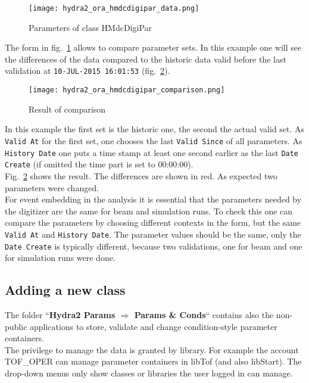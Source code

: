 \begin{figure}[\htb]
  \centering
  \texttt{[image: hydra2\_ora\_hmdcdigipar\_data.png]}
  \caption[Parameters of class HMdcDigiPar]{Parameters of class HMdcDigiPar}
  \label{fig:oraHMdcDigiParData}
\end{figure}

The form in fig.~\ref{fig:oraHMdcDigiParData} allows to compare parameter sets. In this example one will see the 
differences of the data compared to the historic data valid before the last validation at \verb+10-JUL-2015 16:01:53+ (fig.~\ref{fig:oraHMdcDigiParComparison}).

\begin{figure}[\htb]
  \centering
  \texttt{[image: hydra2\_ora\_hmdcdigipar\_comparison.png]}
  \caption[Result of comparison]{Result of comparison}
  \label{fig:oraHMdcDigiParComparison}
\end{figure}
\clearpage

In this example the first set is the historic one, the second the actual valid set. As \verb+Valid At+ for the first set, 
one chooses the last \verb+Valid Since+ of all parameters. As \verb+History Date+ one puts a time stamp at least one 
second earlier as the last \verb+Date Create+ (if omitted the time part is set to 00:00:00).\\
Fig.~\ref{fig:oraHMdcDigiParComparison} shows the result. The differences are shown in red. As expected two 
parameters were changed.\\

For event embedding in the analysis it is essential that the parameters needed by the digitizer are the same for beam  
and simulation runs. To check this one can compare the parameters by choosing different contexts in the form, but 
the same \verb+Valid At+ and \verb+History Date+. The parameter values should be the same, only the \verb+Date Create+ 
is typically different, because two validations, one for beam and one for simulation runs were done.

\subsection[Adding a new class]{Adding a new class}

The folder ``\textbf{Hydra2 Params $\Rightarrow$ Params \& Conds}`` contains also the non-public applications to store, validate 
and change condition-style parameter containers.\\
The privilege to manage the data is granted by library. For example the account TOF\_OPER can manage parameter containers in 
libTof (and also libStart). The drop-down menus only show classes or libraries the user logged in can manage.

